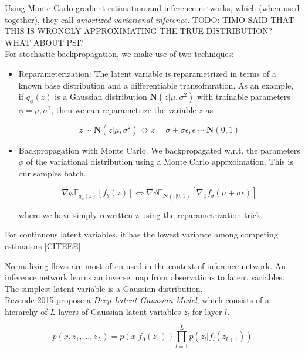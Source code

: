\documentclass[a4paper,12pt,twoside,openright]{report}
\begin{document}
Using Monte Carlo gradient estimation and inference networks, which (when used together), they call \textit{amortized variational inference}.
TODO: TIMO SAID THAT THIS IS WRONGLY APPROXIMATING THE TRUE DISTRIBUTION? WHAT ABOUT PSI? \\

For stochastic backpropagation, we make use of two techniques:

\begin{itemize}
\item Reparameterization: The latent variable is reparametrized in terms of a known base distribution and a differentiable transofmration.
As an example, if $q_\phi(z)$ is a Gaussian distribution $\mathbf{N}(z| \mu, \sigma^2)$ with trainable parameters $\phi = {\mu, \sigma^2}$, then we can reparametrize the variable $z$ as 

\begin{equation}
	z \sim \mathbf{N}(z | \mu, \sigma^2) \iff z = \sigma + \sigma \epsilon, \epsilon \sim \mathbf{N}(0, 1)
\end{equation}

\item Backpropagation with Monte Carlo. We backpropagated w.r.t. the parameters $\phi$ of the variational distribution using a Monte Carlo apprxoimation. 
This is our samples batch.

\begin{equation}
\nabla\phi \mathbb{E}_{q_\phi(z)}\left[ f_\theta(z) \right] 
\iff 
\nabla\phi \mathbb{E}_{\mathbf{N} (\epsilon | 0, 1)}\left[ \nabla_{\phi} f_\theta (\mu +  \sigma \epsilon) \right]
\end{equation}

where we have simply rewritten z using the reparametrization trick.

\end{itemize}

For continuous latent variables, it has the lowest variance among competing estimators [CITEEE].

Normalizing flows are most often used in the context of inference network. 
An inference network learns an inverse map from observations to latent variables.
The simplest latent variable is a Gaussian distribution. \\

Rezende 2015 propose a \textit{Deep Latent Gaussian Model}, which consists of a hierarchy of $L$ layers of Gaussian latent variables $z_l$ for layer $l$.

\begin{equation}
p(x, z_1, \ldots, z_L) = p(x | f_0(z_1)) \prod_{l=1}^{L} p(z_l | f_l(z_{l+1}))
\end{equation}
\end{document}
